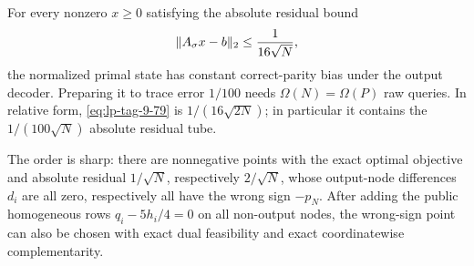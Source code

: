 \begin{theorem}
\label{thm:lp-unit-threshold}
For every nonzero \(x\geq0\) satisfying the absolute residual bound
\begin{equation}
 \lVert A_\sigma x-b\rVert_2\leq\frac1{16\sqrt N},
\label{eq:lp-tag-9-79}
\end{equation}
the normalized primal state has constant correct-parity bias under the
output decoder.  Preparing it
to trace error \(1/100\) needs \(\Omega(N)=\Omega(P)\) raw queries.  In
relative form, \eqref{eq:lp-tag-9-79} is \(1/(16\sqrt{2N})\); in particular it contains
the \(1/(100\sqrt N)\) absolute residual tube.

The order is sharp: there are nonnegative points with the exact optimal
objective and absolute residual \(1/\sqrt N\), respectively \(2/\sqrt N\),
whose output-node differences \(d_i\) are all zero, respectively all have the
wrong sign \(-p_N\).  After adding the public homogeneous rows
\(q_i-5h_i/4=0\) on all non-output nodes, the wrong-sign point can also be
chosen with exact dual feasibility and exact coordinatewise
complementarity.
\end{theorem}


